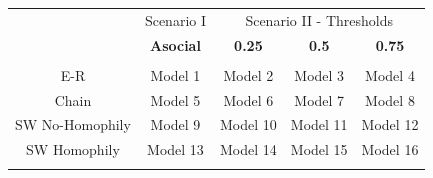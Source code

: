 \documentclass[man, 12pt, a4paper, nolmodern, noextraspace]{apa6}
\begin{document}
\begin{table}[!htbp]
\begin{minipage}{\textwidth}
  \begin{tabular}{ ccccc}
\toprule
      \multicolumn{1}{c}{} &
      \multicolumn{1}{c}{Scenario I} &
      \multicolumn{3}{c}{Scenario II - Thresholds} \\
\cline{3-5}
 & \textbf{Asocial} & \textbf{0.25} & \textbf{0.5} & \textbf{0.75} \\
\hline \\[-1.8ex] 
              E-R & Model 1 & Model 2 & Model 3 & Model 4 \\ 
            Chain & Model 5 & Model 6 & Model 7 & Model 8 \\ 
  SW No-Homophily & Model 9 & Model 10 & Model 11 & Model 12 \\ 
     SW Homophily & Model 13 & Model 14 & Model 15 & Model 16 \\ 
\hline \\[-1.8ex]  
  \end{tabular}
  \end{minipage}
\end{table} 
\end{document}
